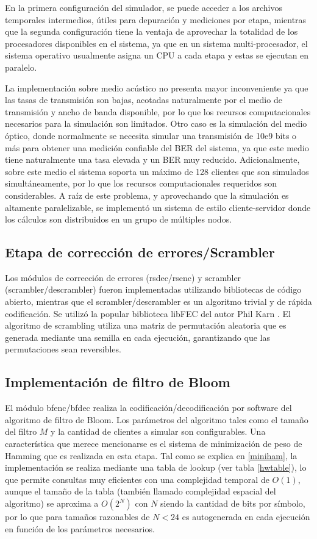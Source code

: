 En la primera configuración del simulador, se puede acceder a los archivos temporales intermedios, útiles para depuración y mediciones por etapa, mientras que la segunda configuración tiene la ventaja de aprovechar la totalidad de los procesadores disponibles en el sistema, ya que en un sistema multi-procesador, el sistema operativo usualmente asigna un CPU a cada etapa y estas se ejecutan en paralelo.

La implementación sobre medio acústico no presenta mayor inconveniente ya que las tasas de transmisión son bajas, acotadas naturalmente por el medio de transmisión y ancho de banda disponible, por lo que los recursos computacionales necesarios para la simulación son limitados. Otro caso es la simulación del medio óptico, donde normalmente se necesita simular una transmisión de 10e9 bits o más para obtener una medición confiable del BER del sistema, ya que este medio tiene naturalmente una tasa elevada y un BER muy reducido. Adicionalmente, sobre este medio el sistema soporta un máximo de 128 clientes que son simulados simultáneamente, por lo que los recursos computacionales requeridos son considerables. A raíz de este problema, y aprovechando que la simulación es altamente paralelizable, se implementó un sistema de estilo cliente-servidor donde los cálculos son distribuidos en un grupo de múltiples nodos.

\subsection{Etapa de corrección de errores/Scrambler}

Los módulos de corrección de errores (rsdec/rsenc) y scrambler (scrambler/descrambler) fueron implementadas utilizando bibliotecas de código abierto, mientras que el scrambler/descrambler es un algoritmo trivial y de rápida codificación. Se utilizó la popular biblioteca libFEC del autor Phil Karn \cite{libfec}. El algoritmo de scrambling utiliza una matriz de permutación aleatoria que es generada mediante una semilla en cada ejecución, garantizando que las permutaciones sean reversibles.

\subsection{Implementación de filtro de Bloom}
El módulo bfenc/bfdec realiza la codificación/decodificación por software del algoritmo de filtro de Bloom. Los parámetros del algoritmo tales como el tamaño del filtro $M$ y la cantidad de clientes a simular son configurables. Una característica que merece mencionarse es el sistema de minimización de peso de Hamming que es realizada en esta etapa. Tal como se explica en \ref{miniham}, la  implementación se realiza mediante una tabla de lookup (ver tabla \ref{hwtable}), lo que permite consultas muy eficientes con una complejidad temporal de $O(1)$, aunque el tamaño de la tabla (también llamado complejidad espacial del algoritmo) se aproxima a $O(2^{N})$ con $N$ siendo la cantidad de bits por símbolo, por lo que para tamaños razonables de $N<24$ es autogenerada en cada ejecución en función de los parámetros necesarios.

